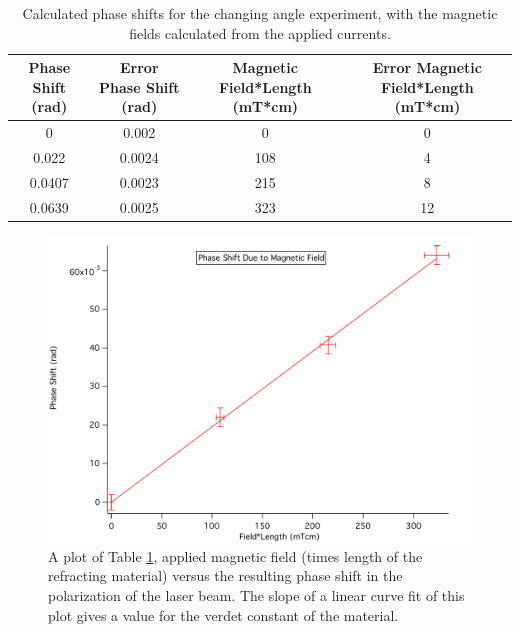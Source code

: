 \documentclass[prb,preprint]{revtex4-1}
\begin{document}
\begin{table}[h!]
\centering
\caption{Calculated phase shifts for the changing angle experiment, with the magnetic fields calculated from the applied currents.}
\begin{ruledtabular}
\begin{tabular}{c c c c}
Phase Shift (rad) & Error Phase Shift (rad) & Magnetic Field*Length (mT*cm) & Error Magnetic Field*Length (mT*cm)\\
\hline	%
0 & 0.002  & 0  & 0  \\
0.022  & 0.0024 & 108 & 4  \\
0.0407 & 0.0023 & 215 & 8  \\
0.0639 & 0.0025 & 323 & 12
\end{tabular}
\end{ruledtabular}
\label{B*L_PhaseShift_Table}
\end{table}

\begin{figure}[h!]
\centering
\includegraphics[width=5in]{PhaseShift_B-L_Plot.pdf}
\caption{A plot of Table \ref{B*L_PhaseShift_Table}, applied magnetic field (times length of the refracting material) versus the resulting phase shift in the polarization of the laser beam. The slope of a linear curve fit of this plot gives a value for the verdet constant of the material. }
\label{PhaseShift_B*L_Plot}
\end{figure}
\end{document}
